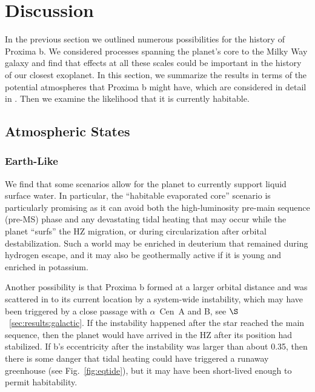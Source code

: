 \documentclass[preprint,12pt]{aastex}
\def\acen{{$\alpha$~Cen}}
\begin{document}
\section{Discussion\label{sec:disc}}

In the previous section we outlined numerous possibilities for the
history of Proxima b. We considered processes spanning the planet's
core to the Milky Way galaxy and find that effects at all these scales
could be important in the history of our closest exoplanet. In this
section, we summarize the results in terms of the potential
atmospheres that Proxima b might have, which are considered in
detail in \citep{Meadows16}. Then we examine the likelihood that it is
currently habitable.

\subsection{Atmospheric States}
\label{sec:results:atmstates}

\subsubsection{Earth-Like}
\label{sec:results:atmstates:earthlike}

We find that some scenarios allow for the planet to currently support liquid
surface water. In particular, the ``habitable evaporated core'' scenario
\citep{Luger15} is particularly promising as it can avoid both the
high-luminosity pre-main sequence (pre-MS) phase and any devastating tidal
heating that may occur while the planet ``surfs'' the HZ migration, or
during circularization after orbital destabilization. Such a world may
be enriched in deuterium that remained during hydrogen escape, and it
may also be geothermally active if it is young and enriched in
potassium.

Another possibility is that Proxima b formed at a larger orbital
distance and was scattered in to its current location by a system-wide
instability, which may have been triggered by a close passage with
\acen~A and B, see $\S$~\ref{sec:results:galactic}. If the instability
happened after the star reached the main sequence, then the planet
would have arrived in the HZ after its position had stabilized. If b's
eccentricity after the instability was larger than about 0.35, then
there is some danger that tidal heating could have triggered a runaway
greenhouse (see Fig.~\ref{fig:eqtide}), but it may have been
short-lived enough to permit habitability.
\end{document}
